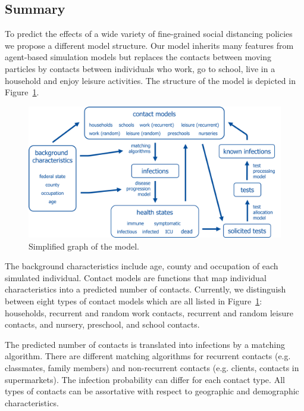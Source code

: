 \subsection{Summary}
\label{sub:model_summary}

To predict the effects of a wide variety of fine-grained social distancing policies we
propose a different model structure. Our model inherits many features from agent-based
simulation models but replaces the contacts between moving particles by contacts between
individuals who work, go to school, live in a household and enjoy leisure activities.
The structure of the model is depicted in Figure~\ref{fig:model_graph}.

\begin{figure}[!tp]
    \centering
    \includegraphics[width=\textwidth]{../figures/model_detailed.png}
    \caption{Simplified graph of the model.}
    \label{fig:model_graph}
\end{figure}

The background characteristics include age, county and occupation of each simulated
individual. Contact models are functions that map individual characteristics into a
predicted number of contacts. Currently, we distinguish between eight types of contact
models which are all listed in Figure~\ref{fig:model_graph}: households, recurrent and
random work contacts, recurrent and random leisure contacts, and nursery, preschool, and
school contacts.

The predicted number of contacts is translated into infections by a matching algorithm.
There are different matching algorithms for recurrent contacts (e.g. classmates, family
members) and non-recurrent contacts (e.g. clients, contacts in supermarkets). The
infection probability can differ for each contact type. All types of contacts can be
assortative with respect to geographic and demographic characteristics.

